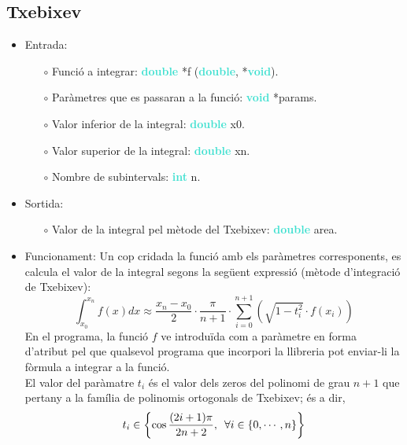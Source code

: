 \documentclass[12pt]{article}
\begin{document}
\subsection{Txebixev}
\begin{itemize}
    \item Entrada:
    \begin{itemize}
        \item[$\circ$] Funció a integrar: \textbf{\textcolor{Turquoise}{double}} *f (\textbf{\textcolor{Turquoise}{double}},  *\textbf{\textcolor{Turquoise}{void}}).
        \item[$\circ$] Paràmetres que es passaran a la funció: \textbf{\textcolor{Turquoise}{void}} *params.
        \item[$\circ$] Valor inferior de la integral: \textbf{\textcolor{Turquoise}{double}} x0.
        \item[$\circ$] Valor superior de la integral: \textbf{\textcolor{Turquoise}{double}} xn.
        \item[$\circ$] Nombre de subintervals: \textbf{\textcolor{Turquoise}{int}} n.
    \end{itemize}
    \item Sortida:
        \begin{itemize}
            \item[$\circ$] Valor de la integral pel mètode del Txebixev: \textbf{\textcolor{Turquoise}{double}} area.
        \end{itemize}
    \item Funcionament:
    Un cop cridada la funció amb els paràmetres corresponents, es calcula el valor de la integral segons la següent expressió (mètode d'integració de Txebixev):
        \begin{equation*}
            \int_{x_0}^{x_n}f(x)dx \approx \frac{x_n - x_0}{2} \cdot \frac{\pi}{n+1} \cdot \sum_{i=0}^{n+1} \left( \sqrt{1-t_i^2} \cdot f(x_i)\right)
        \end{equation*}
        En el programa, la funció $f$ ve introduïda com a paràmetre en forma d'atribut pel que qualsevol programa que incorpori la llibreria pot enviar-li la fòrmula a integrar a la funció.\\
        El valor del paràmatre $t_i$ és el valor dels zeros del polinomi de grau $n+1$ que pertany a la família de polinomis ortogonals de Txebixev; és a dir, \\
        $$t_i\in\left\{\cos{\frac{(2i+1)\pi}{2n+2}}, \hspace{0.5em}\forall i \in \{0,\cdots, n\}\right\}$$

\end{itemize}
\newpage
\end{document}

